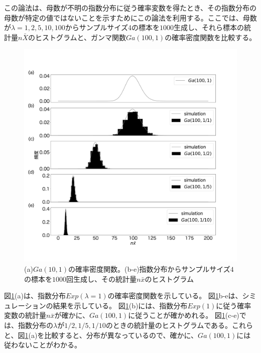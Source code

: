 この論法は、母数が不明の指数分布に従う確率変数を得たとき、その指数分布の母数が特定の値ではないことを示すためにこの論法を利用する。ここでは、母数が$\lambda=1,2,5,10,100$からサンプルサイズ4の標本を$1000$生成し、それら標本の統計量$n\bar{X}$のヒストグラムと、ガンマ関数$Ga(100,1)$の確率密度関数を比較する。

\begin{figure}
    \centering
    \includegraphics[width=15cm]{./image/02_/Exp_Gamma_simulation.pdf}
    \caption{(a)$Ga(10,1)$の確率密度関数。(b-e)指数分布からサンプルサイズ$4$の標本を$1000$回生成し、その統計量$n\bar{x}$のヒストグラム}
    \label{fig:exp_gamma_simulation}
\end{figure}

図\ref{fig:exp_gamma_simulation}(a)は、指数分布$Exp(\lambda=1)$の確率密度関数を示している。
図\ref{fig:exp_gamma_simulation}b-eは、シミュレーションの結果を示している。
図\ref{fig:exp_gamma_simulation}(b)には、指数分布$Exp(1)$に従う確率変数の統計量$n\bar{x}$が確かに、$Ga(100,1)$に従うことが確かめれる。
図\ref{fig:exp_gamma_simulation}(c-e)では、指数分布の$\lambda$が$1/2,1/5,1/10$のときの統計量のヒストグラムである。これらと、図\ref{fig:exp_gamma_simulation}(a)を比較すると、分布が異なっているので、確かに、$Ga(100,1)$には従わないことがわかる。
\fi



